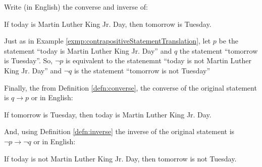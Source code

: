 \guard






\begin{exmp}
\label{exmp:converseInverseStatementTranslation}
  Write (in English) the converse and inverse of:
  \begin{center}
      If today is Martin Luther King Jr. Day, then tomorrow is Tuesday.
  \end{center}

  Just as in Example \ref{exmp:contrapositiveStatementTranslation}, let $p$ be the statement ``today is Martin Luther King Jr. Day'' and $q$ the statement ``tomorrow is Tuesday''.
  So, $\neg p$ is equivalent to the statenemnt ``today is not Martin Luther King Jr. Day'' and $\neg q$ is the statement ``tomorrow is not Tuesday''

  Finally, the from Definition \ref{defn:converse}, the converse of the original statement is $q \rightarrow p$ or in English:
  \begin{center}
      If tomorrow is Tuesday, then today is Martin Luther King Jr. Day.
  \end{center}
  And, using Definition \ref{defn:inverse} the inverse of the original statement is $\neg p \rightarrow \neg q$ or in English:
  \begin{center}
      If today is not Martin Luther King Jr. Day, then tomorrow is not Tuesday.
  \end{center}
\end{exmp}

